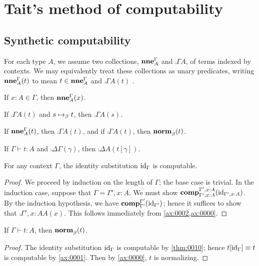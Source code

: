 \documentclass[a4paper]{article}
\begin{document}
\section{Tait's method of computability}
\label{sec:0006}

\subsection{Synthetic computability}
\label{sec:0108}

For each type $A$, we assume two collections, $\operatorname{\mathbf{nne}}^{\Gamma}_{A}$ and $\comp{\Gamma}{A}$, of terms indexed by contexts.
We may equivalently treat these collections as unary predicates, writing $\operatorname{\mathbf{nne}}^{\Gamma}_{A}(t)$ to mean $t \in \operatorname{\mathbf{nne}}^{\Gamma}_{A}$ and $\comp{\Gamma}{A}(t)$ \mutatismutandis.

\begin{axiom}\label{ax:0002}
  If $x : A \in \Gamma$, then $\operatorname{\mathbf{nne}}^{\Gamma}_{A}(x)$.
\end{axiom}

\begin{axiom}\label{ax:0003}
  If $\comp{\Gamma}{A}(t)$ and $s \bRed t$, then $\comp{\Gamma}{A}(s)$.
\end{axiom}

\begin{axiom}\label{ax:0000}
  If $\operatorname{\mathbf{nne}}^{\Gamma}_{A}(t)$, then $\comp{\Gamma}{A}(t)$, and if $\comp{\Gamma}{A}(t)$, then $\operatorname{\mathbf{norm}}^{}_{\beta}(t)$.
\end{axiom}

\begin{axiom}\label{ax:0001}
  If $\Gamma \vdash t : A$ and $\comp{\Delta}{\Gamma}(\gamma)$, then $\comp{\Delta}{A}(t[\gamma])$.
\end{axiom}

\begin{lemma}\label{thm:0010}
  For any context $\Gamma$, the identity substitution $\mathrm{id}_{\Gamma}$ is computable.
\end{lemma}
\begin{proof}
  We proceed by induction on the length of $\Gamma$; the base case is trivial.
  In the induction case, suppose that $\Gamma = \Gamma',x : A$.
  We must show $\operatorname{\mathbf{comp}}^{\Gamma',x : A}_{\Gamma',x : A}(\mathrm{id}_{\Gamma',x : A})$.
  By the induction hypothesis, we have $\operatorname{\mathbf{comp}}^{\Gamma'}_{\Gamma'}(\mathrm{id}_{\Gamma'})$; hence it suffices to show that $\comp{\Gamma',x : A}{A}(x)$.
  This follows immediately from \cref{ax:0002,ax:0000}.
\end{proof}

\begin{theorem}[Normalization]\label{thm:0000}
  If $\Gamma \vdash t : A$, then $\operatorname{\mathbf{norm}}^{}_{\beta}(t)$.
\end{theorem}
\begin{proof}
  The identity substitution $\mathrm{id}_{\Gamma}$ is computable by \cref{thm:0010}; hence $t[\mathrm{id}_{\Gamma}] \equiv t$ is computable by \cref{ax:0001}.
  Then by \cref{ax:0000}, $t$ is normalizing.
\end{proof}
\end{document}
